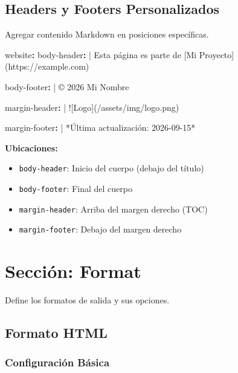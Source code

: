\documentclass[
  doc,
  floatsintext,
  longtable,
  a4paper,
  nolmodern,
  notxfonts,
  notimes,
  12pt,
  colorlinks=true,linkcolor=blue,citecolor=blue,urlcolor=blue]{apa7}
\newenvironment{Shaded}{\begin{snugshade}}{\end{snugshade}}
\newcommand{\CharTok}[1]{\textcolor[rgb]{0.13,0.47,0.30}{#1}}
\newcommand{\FunctionTok}[1]{\textcolor[rgb]{0.28,0.35,0.67}{#1}}
\newcommand{\KeywordTok}[1]{\textcolor[rgb]{0.00,0.23,0.31}{\textbf{#1}}}
\newcommand{\NormalTok}[1]{\textcolor[rgb]{0.00,0.23,0.31}{#1}}
\providecommand{\tightlist}{%
  \setlength{\itemsep}{0pt}\setlength{\parskip}{0pt}}
\begin{document}
\subsection{Headers y Footers
Personalizados}\label{headers-y-footers-personalizados}

Agregar contenido Markdown en posiciones específicas.

\begin{Shaded}
\begin{Highlighting}[]
\FunctionTok{website}\KeywordTok{:}
\FunctionTok{  body{-}header}\KeywordTok{: }\CharTok{|}
\NormalTok{    Esta página es parte de [Mi Proyecto](https://example.com)}
    
\FunctionTok{  body{-}footer}\KeywordTok{: }\CharTok{|}
\NormalTok{    © 2026 Mi Nombre}
    
\FunctionTok{  margin{-}header}\KeywordTok{: }\CharTok{|}
\NormalTok{    ![Logo](/assets/img/logo.png)}
    
\FunctionTok{  margin{-}footer}\KeywordTok{: }\CharTok{|}
\NormalTok{    *Última actualización: 2026{-}09{-}15*}
\end{Highlighting}
\end{Shaded}

\textbf{Ubicaciones:}

\begin{itemize}
\tightlist
\item
  \texttt{body-header}: Inicio del cuerpo (debajo del título)
\item
  \texttt{body-footer}: Final del cuerpo
\item
  \texttt{margin-header}: Arriba del margen derecho (TOC)
\item
  \texttt{margin-footer}: Debajo del margen derecho
\end{itemize}

\section{Sección: Format}\label{secciuxf3n-format}

Define los formatos de salida y sus opciones.

\subsection{Formato HTML}\label{formato-html}

\subsubsection{Configuración Básica}\label{configuraciuxf3n-buxe1sica-2}
\end{document}
